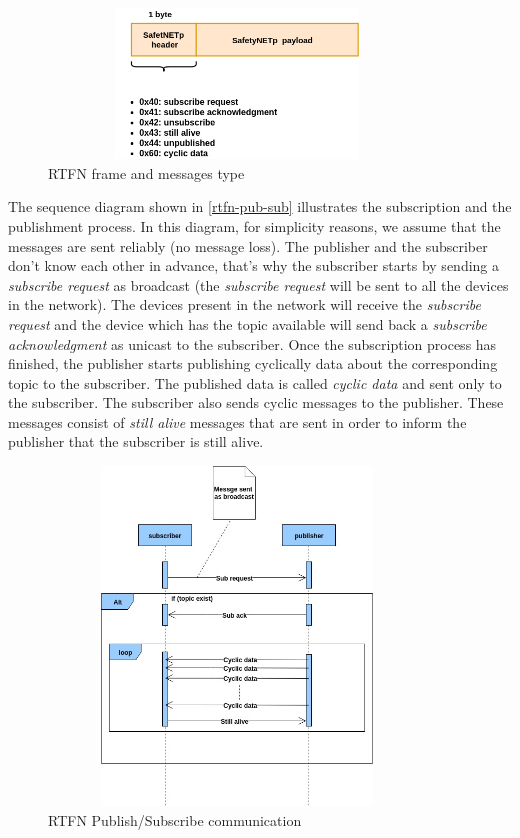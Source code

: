\begin{figure}[H]
\centering
\includegraphics[width=10cm,height=4cm]{figures/safetynetp/rtfn-frame-and-messages-type.png}
\caption{RTFN frame and messages type}\label{rtfn-frame-and-messages-type}
\end{figure}

The sequence diagram shown in \autoref{rtfn-pub-sub} illustrates the subscription and the publishment process. In this
diagram, for simplicity reasons, we assume that the messages are sent reliably (no message loss). The publisher and the
subscriber don't know each other in advance, that's why the subscriber starts by sending a \textit{subscribe request} as broadcast (the \textit{subscribe request}
will be sent to all the devices in the network). The devices present in the network will receive the \textit{subscribe request} and
the device which has the topic available will send back a \textit{subscribe acknowledgment} as unicast to the subscriber.
Once the subscription process has finished, the publisher starts publishing cyclically data about the corresponding topic to the subscriber.
The published data is called \textit{cyclic data} and sent only to the subscriber. The subscriber also
sends cyclic messages to the publisher. These messages consist of \textit{still alive} messages that are sent in order to inform the publisher that the subscriber is still alive.

\begin{figure}[H]
\centering
\includegraphics[width=10cm,height=9cm]{figures/safetynetp/rtfn-pub-sub.jpg}
\caption{RTFN Publish/Subscribe communication}\label{rtfn-pub-sub}
\end{figure}

